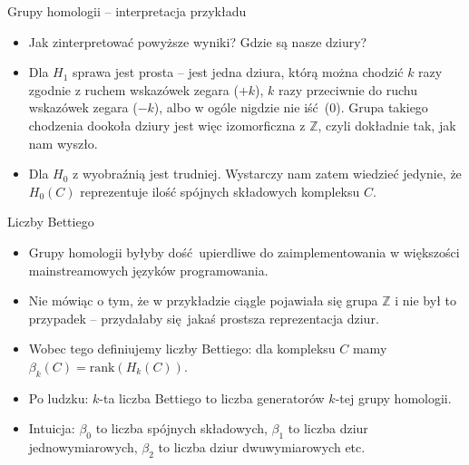 \documentclass{beamer}
\begin{document}
\begin{frame}{Grupy homologii -- interpretacja przykładu}
\begin{itemize}
	\item Jak zinterpretować powyższe wyniki? Gdzie są nasze dziury?
	\item Dla $H_1$ sprawa jest prosta -- jest jedna dziura, którą można chodzić $k$ razy zgodnie z ruchem wskazówek zegara ($+k$), $k$ razy przeciwnie do ruchu wskazówek zegara ($-k$), albo w ogóle nigdzie nie iść ($0$). Grupa takiego chodzenia dookoła dziury jest więc izomorficzna z $\mathbb{Z}$, czyli dokładnie tak, jak nam wyszło.
	\item Dla $H_0$ z wyobraźnią jest trudniej. Wystarczy nam zatem wiedzieć jedynie, że $H_0(C)$ reprezentuje ilość spójnych składowych kompleksu $C$.	
\end{itemize}
\end{frame}

\begin{frame}{Liczby Bettiego}
\begin{itemize}
	\item Grupy homologii byłyby dość upierdliwe do zaimplementowania w większości mainstreamowych języków programowania.
	\item Nie mówiąc o tym, że w przykładzie ciągle pojawiała się grupa $\mathbb{Z}$ i nie był to przypadek -- przydałaby się jakaś prostsza reprezentacja dziur.
	\item Wobec tego definiujemy liczby Bettiego: dla kompleksu $C$ mamy $\beta_k(C) = \text{rank}(H_k(C))$.
	\item Po ludzku: $k$-ta liczba Bettiego to liczba generatorów $k$-tej grupy homologii.
	\item Intuicja: $\beta_0$ to liczba spójnych składowych, $\beta_1$ to liczba dziur jednowymiarowych, $\beta_2$ to liczba dziur dwuwymiarowych etc.
\end{itemize}
\end{frame}
\end{document}
